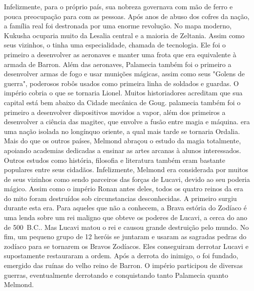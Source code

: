 Infelizmente, para o próprio país, sua nobreza governava com mão de ferro e pouca preocupação para com as pessoas.
Após anos de abuso dos cofres da nação, a família real foi destronada por uma enorme revolução.
No mapa moderno, Kukusha ocuparia muito da Lesalia central e a maioria de Zeltania.
Assim como seus vizinhos, o  tinha uma especialidade, chamada de tecnologia.
Ele foi o primeiro a desenvolver as aeronaves e manter uma frota que era equivalente à armada de Barron.
Além das aeronaves, Palamecia também foi o primeiro a desenvolver armas de fogo e usar munições mágicas, assim como seus "Golens de guerra", poderosos robôs usados como primeira linha de soldados e guardas.
O império cobria o que se tornaria Lionel.
Muitos historiadores acreditam que sua capital está bem abaixo da Cidade mecânica de Goug. 
palamecia também foi o primeiro a desenvolver dispositivos movidos a vapor, além dos primeiros a desenvolver a ciência das magitec, que envolve a fusão entre magia e máquina.
 era uma nação isolada no longínquo oriente, a qual mais tarde se tornaria Ordalia.
Mais do que os outros países, Melmond abraçou o estudo da magia totalmente, apoiando academias dedicadas a ensinar as artes arcanas à alunos interessados.
Outros estudos como história, filosofia e literatura também eram bastante populares entre seus cidadãos.
Infelizmente, Melmond era considerada por muitos de seus vizinhos como sendo parceiros das forças de Lucavi, devido ao seu poderia mágico.
Assim como o império Ronan antes deles, todos os quatro reinos da era do mito foram destruídos sob circunstancias desconhecidas.
A  primeiro surgiu durante esta era.
Para aqueles que não a conhecem, a Brava estória do Zodíaco é uma lenda sobre um rei maligno que obteve os poderes de Lucavi, a cerca do ano de 500~B.C..
Mas Lucavi matou o rei e causou grande destruição pelo mundo.
No fim, um pequeno grupo de 12 heróis se juntaram e usaram as sagradas pedras do zodíaco para se tornarem os Bravos Zodíacos.
Eles conseguiram derrotar Lucavi e supostamente restauraram a ordem. Após a derrota do inimigo, o  foi fundado, emergido das ruínas do velho reino de Barron.
O império participou de diversas guerras, eventualmente derrotando e conquistando tanto Palamecia quanto Melmond.
%
\vfill
